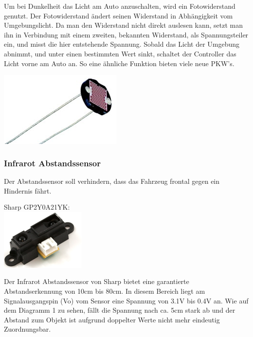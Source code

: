 \documentclass{scrartcl}
\begin{document}
			Um bei Dunkelheit das Licht am Auto anzuschalten, wird ein Fotowiderstand genutzt.
			Der Fotowiderstand ändert seinen Widerstand in Abhängigkeit vom Umgebungslicht.
			Da man den Widerstand nicht direkt auslesen kann, setzt man ihn in Verbindung mit einem zweiten,
			bekannten Widerstand, als Spannungsteiler ein, und misst die hier entstehende Spannung.
			Sobald das Licht der Umgebung abnimmt, und unter einen bestimmten Wert sinkt,
			schaltet der Controller das Licht vorne am Auto an.
			So eine ähnliche Funktion bieten viele neue PKW's.

			\includegraphics{images/helligkeitssensor.png}

		\subsubsection{Infrarot Abstandssensor} %
			Der Abstandssensor soll verhindern, dass das Fahrzeug frontal gegen ein Hindernis fährt.

			Sharp GP2Y0A21YK:\\
			\includegraphics{images/infrarotsensor.png}

			Der Infrarot Abstandssensor von Sharp bietet eine garantierte Abstandserkennung von 10cm bis 80cm.
			In diesem Bereich liegt am Signalausgangspin (Vo) vom Sensor eine Spannung von 3.1V bis 0.4V an.
			Wie auf dem Diagramm 1 zu sehen, fällt die Spannung nach ca. 5cm stark ab
			und der Abstand zum Objekt ist aufgrund doppelter Werte nicht mehr eindeutig Zuordnungsbar. 
\end{document}
